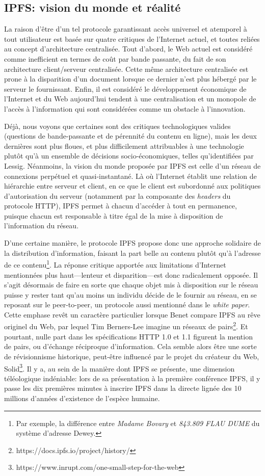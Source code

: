 \documentclass{article}
\begin{document}
\subsection{IPFS: vision du monde et réalité}

La raison d'être d'un tel protocole garantissant accès universel et atemporel à tout utilisateur est basée sur quatre critiques de l'Internet actuel, et toutes reliées au concept d'architecture centralisée. Tout d'abord, le Web actuel est considéré comme  inefficient en termes de coût par bande passante, du fait de son architecture client/serveur centralisée. Cette même architecture centralisée est prone à la disparition d'un document lorsque ce dernier n'est plus hébergé par le serveur le fournissant. Enfin, il est considéré le développement économique de l'Internet et du Web aujourd'hui tendent à une centralisation et un monopole de l'accès à l'information qui sont considérées comme un obstacle à l'innovation.

Déjà, nous voyons que certaines sont des critiques technologiques valides (questions de bande-passante et de pérennité du contenu en ligne), mais les deux dernières sont plus floues, et plus difficilement attribuables à une technologie plutôt qu'à un ensemble de décisions socio-économiques, telles qu'identifiées par Lessig. Néanmoins, la vision du monde proposée par IPFS est celle d'un réseau de connexions perpétuel et quasi-instantané. Là où l'Internet établit une relation de hiérarchie entre serveur et client, en ce que le client est subordonné aux politiques d'autorisation du serveur (notamment par la composante des \emph{headers} du protocole HTTP), IPFS permet à chacun d'accéder à tout en permanence, puisque chacun est responsable à titre égal de la mise à disposition de l'information du réseau.

D'une certaine manière, le protocole IPFS propose donc une approche solidaire de la distribution d'information, faisant la part belle au contenu plutôt qu'à l'adresse de ce contenu\footnote{Par exemple, la différence entre \emph{Madame Bovary} et \emph{843.809 FLAU DUME} du système d'adresse Dewey.}. La réponse critique apportée aux limitations d'Internet mentionnées plus haut—lenteur et disparition—est donc radicalement opposée. Il s'agit désormais de faire en sorte que chaque objet mis à disposition sur le réseau puisse y rester tant qu'au moins un individu décide de le fournir au réseau, en se reposant sur le peer-to-peer, un protocole aussi mentionné dans le \emph{white paper}. Cette emphase revêt un caractère particulier lorsque Benet compare IPFS au rêve originel du Web, par lequel Tim Berners-Lee imagine un réseaux de pairs\footnote{https://docs.ipfs.io/project/history/}. Et pourtant, nulle part dans les spécifications HTTP 1.0 et 1.1 figurent la mention de pairs, ou d'échange réciproque d'information. Cela semble alors être une sorte de révisionnisme historique, peut-être influencé par le projet du créateur du Web, Solid\footnote{https://www.inrupt.com/one-small-step-for-the-web}. Il y a, au sein de la manière dont IPFS se présente, une dimension téléologique indéniable: lors de sa présentation à la première conférence IPFS, il y passe les dix premières minutes à inscrire IPFS dans la directe lignée des 10 millions d'années d'existence de l'espèce humaine.
\end{document}
